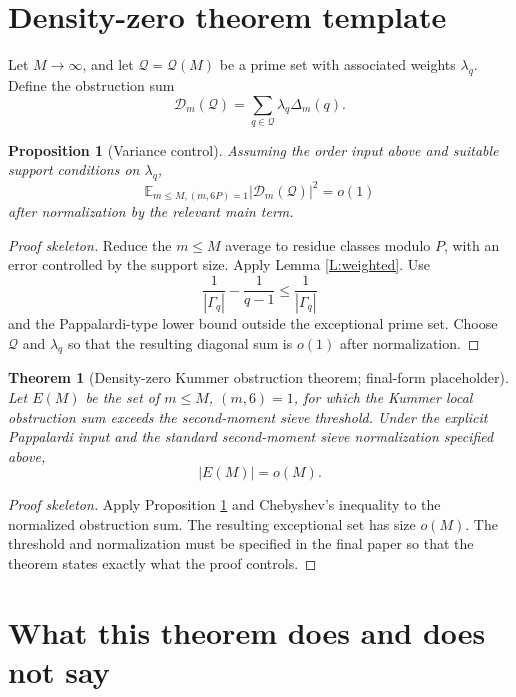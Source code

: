 \documentclass[11pt]{article}
\newtheorem{theorem}{Theorem}
\newtheorem{proposition}{Proposition}
\newcommand{\E}{\mathbb E}
\newcommand{\1}{\mathbf 1}
\begin{document}
\section{Density-zero theorem template}

Let \(M\to\infty\), and let \(\mathcal Q=\mathcal Q(M)\) be a prime set with associated weights \(\lambda_q\).  Define the obstruction sum
\[
\mathcal D_m(\mathcal Q)=\sum_{q\in\mathcal Q}\lambda_q\Delta_m(q).
\]

\begin{proposition}[Variance control]\label{P:variance}
Assuming the order input above and suitable support conditions on \(\lambda_q\),
\[
\E_{m\le M,(m,6P)=1}|\mathcal D_m(\mathcal Q)|^2=o(1)
\]
after normalization by the relevant main term.
\end{proposition}

\begin{proof}[Proof skeleton]
Reduce the \(m\le M\) average to residue classes modulo \(P\), with an error controlled by the support size.  Apply Lemma \ref{L:weighted}.  Use
\[
\frac1{|\Gamma_q|}-\frac1{q-1}\le\frac1{|\Gamma_q|}
\]
and the Pappalardi-type lower bound outside the exceptional prime set.  Choose \(\mathcal Q\) and \(\lambda_q\) so that the resulting diagonal sum is \(o(1)\) after normalization.
\end{proof}

\begin{theorem}[Density-zero Kummer obstruction theorem; final-form placeholder]\label{T:dz}
Let \(E(M)\) be the set of \(m\le M\), \((m,6)=1\), for which the Kummer local obstruction sum exceeds the second-moment sieve threshold.  Under the explicit Pappalardi input and the standard second-moment sieve normalization specified above,
\[
|E(M)|=o(M).
\]
\end{theorem}

\begin{proof}[Proof skeleton]
Apply Proposition \ref{P:variance} and Chebyshev's inequality to the normalized obstruction sum.  The resulting exceptional set has size \(o(M)\).  The threshold and normalization must be specified in the final paper so that the theorem states exactly what the proof controls.
\end{proof}

\section{What this theorem does and does not say}
\end{document}
